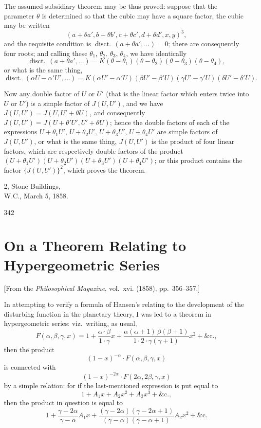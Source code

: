 \documentclass[11pt,a4paper]{book}
\providecommand{\between}{,}
\begin{document}
{{The assumed subsidiary theorem may be thus proved: suppose that the parameter $\theta$ is determined so that the cubic may have a square factor, the cubic may be written
\[
(a + \theta a', b + \theta b', c + \theta c', d + \theta d' \between x, y)^3,
\]
and the requisite condition is $\operatorname{disct.}\,(a + \theta a', \ldots) = 0$; there are consequently four roots; and calling these $\theta_1$, $\theta_2$, $\theta_3$, $\theta_4$, we have identically
\[
\operatorname{disct.}\,(a + \theta a', \ldots) = K(\theta - \theta_1)(\theta - \theta_2)(\theta - \theta_3)(\theta - \theta_4),
\]
or what is the same thing,
\[
\operatorname{disct.}\,(\alpha U - \alpha' U', \ldots) = K(\alpha U' - \alpha' U)(\beta U' - \beta' U)(\gamma U' - \gamma' U)(\delta U' - \delta' U).
\]

Now any double factor of $U$ or $U'$ (that is the linear factor which enters twice into $U$ or $U'$) is a simple factor of $J(U, U')$, and we have $J(U, U') = J(U, U' + \theta U)$, and consequently $J(U, U') = J(U + \theta' U', U' + \theta U)$; hence the double factors of each of the expressions $U + \theta_1 U'$, $U + \theta_2 U'$, $U + \theta_3 U'$, $U + \theta_4 U'$ are simple factors of $J(U, U')$, or what is the same thing, $J(U, U')$ is the product of four linear factors, which are respectively double factors of the product $(U + \theta_1 U')(U + \theta_2 U')(U + \theta_3 U')(U + \theta_4 U')$; or this product contains the factor $\{J(U, U')\}^2$, which proves the theorem.

\begin{flushright}
2, Stone Buildings,\\
W.C., March 5, 1858.
\end{flushright}
\hfill 342
\newpage


\section{On a Theorem Relating to Hypergeometric Series}
\label{sec:211}

[From the \textit{Philosophical Magazine}, vol.~xvi. (1858), pp.~356--357.]
\vspace{1em}

In attempting to verify a formula of Hansen's relating to the development of the disturbing function in the planetary theory, I was led to a theorem in hypergeometric series: viz.\ writing, as usual,
\[
F(\alpha, \beta, \gamma, x) = 1 + \frac{\alpha \cdot \beta}{1 \cdot \gamma}x + \frac{\alpha(\alpha+1)\,\beta(\beta+1)}{1 \cdot 2 \cdot \gamma(\gamma+1)}x^2 + \&\text{c.},
\]
then the product
\[
(1-x)^{-\alpha} \cdot F(\alpha, \beta, \gamma, x)
\]
is connected with
\[
(1-x)^{-2\alpha} \cdot F(2\alpha, 2\beta, \gamma, x)
\]
by a simple relation: for if the last-mentioned expression is put equal to
\[
1 + A_1 x + A_2 x^2 + A_3 x^3 + \&\text{c.},
\]
then the product in question is equal to
\[
1 + \frac{\gamma - 2\alpha}{\gamma - \alpha}A_1 x + \frac{(\gamma - 2\alpha)(\gamma - 2\alpha + 1)}{(\gamma - \alpha)(\gamma - \alpha + 1)}A_2 x^2 + \&\text{c.}
\]

}}
\end{document}
